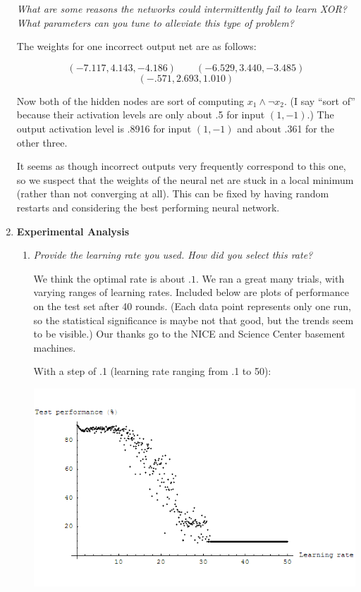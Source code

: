 \documentclass{article}
\begin{document}
\begin{enumerate}
    \textit{What are some reasons the networks could intermittently
      fail to learn XOR?  What parameters can you tune to alleviate
      this type of problem?}

    The weights for one incorrect output net are as follows:

    \[(-7.117, 4.143, -4.186)\qquad(-6.529, 3.440, -3.485)\]
    \[(-.571, 2.693, 1.010)\]

    Now both of the hidden nodes are sort of computing $x_1\wedge\lnot
    x_2$. (I say ``sort of'' because their activation levels are only
    about .5 for input $(1,-1)$.) The output activation level is .8916
    for input $(1,-1)$ and about .361 for the other three.

    It seems as though incorrect outputs very frequently correspond
    to this one, so we suspect that the weights of the neural net
    are stuck in a local minimum (rather than not converging at all). 
    This can be fixed by having random restarts and considering 
    the best performing neural network. 


  \item \textbf{Experimental Analysis}
    \begin{enumerate}
    \item \textit{Provide the learning rate you used. How did you
      select this rate?}

      We think the optimal rate is about $.1$. We ran a great many
      trials, with varying ranges of learning rates. Included below
      are plots of performance on the test set after 40 rounds. (Each
      data point represents only one run, so the statistical
      significance is maybe not that good, but the trends seem to be
      visible.) Our thanks go to the NICE and Science Center basement
      machines.


      With a step of .1 (learning rate ranging from .1 to 50):

      \begin{center}
        \includegraphics[scale=.5]{plot_test_1.png}
      \end{center}


\end{enumerate}
\end{enumerate}
\end{document}
